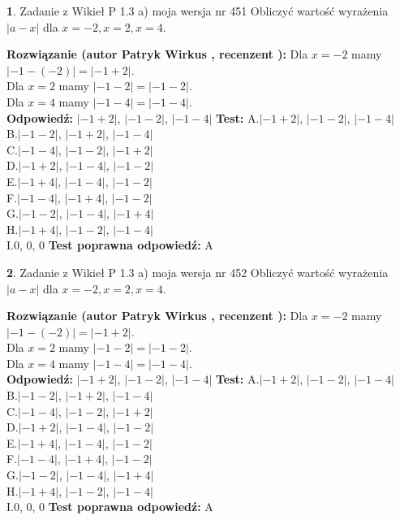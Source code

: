 \documentclass[12pt, a4paper]{article}
\theoremstyle{definition} %
\newtheorem{zad}{}
\newcommand{\zadStart}[1]{\begin{zad}#1\newline}
\newcommand{\zadStop}{\end{zad}}
\newcommand{\rozwStart}[2]{\noindent \textbf{Rozwiązanie (autor #1 , recenzent #2): }\newline}
\newcommand{\rozwStop}{\newline}
\newcommand{\odpStart}{\noindent \textbf{Odpowiedź:}\newline}
\newcommand{\odpStop}{\newline}
\newcommand{\testStart}{\noindent \textbf{Test:}\newline}
\newcommand{\testStop}{\newline}
\newcommand{\kluczStart}{\noindent \textbf{Test poprawna odpowiedź:}\newline}
\newcommand{\kluczStop}{\newline}
\begin{document}
\zadStart{Zadanie z Wikieł P 1.3 a) moja wersja nr 451}
Obliczyć wartość wyrażenia $|a - x|$ dla $x=-2,x=2,x=4$.
\zadStop
\rozwStart{Patryk Wirkus}{}
Dla $x = -2$ mamy $|-1 - (-2)| = |-1 + 2|$.\\
Dla $x = 2$ mamy $|-1 - 2| = |-1 - 2|$.\\
Dla $x = 4$ mamy $|-1 - 4| = |-1 - 4|$.\\
\rozwStop
\odpStart
$|-1 + 2|$, $|-1 - 2|$, $|-1 - 4|$
\odpStop
\testStart
A.$|-1 + 2|$, $|-1 - 2|$, $|-1 - 4|$\\
B.$|-1 - 2|$, $|-1 + 2|$, $|-1 - 4|$\\
C.$|-1 - 4|$, $|-1 - 2|$, $|-1 + 2|$\\
D.$|-1 + 2|$, $|-1 - 4|$, $|-1 - 2|$\\
E.$|-1 + 4|$, $|-1 - 4|$, $|-1 - 2|$\\
F.$|-1 - 4|$, $|-1 + 4|$, $|-1 - 2|$\\
G.$|-1 - 2|$, $|-1 - 4|$, $|-1 + 4|$\\
H.$|-1 + 4|$, $|-1 - 2|$, $|-1 - 4|$\\
I.$0$, $0$, $0$
\testStop
\kluczStart
A
\kluczStop



\zadStart{Zadanie z Wikieł P 1.3 a) moja wersja nr 452}
Obliczyć wartość wyrażenia $|a - x|$ dla $x=-2,x=2,x=4$.
\zadStop
\rozwStart{Patryk Wirkus}{}
Dla $x = -2$ mamy $|-1 - (-2)| = |-1 + 2|$.\\
Dla $x = 2$ mamy $|-1 - 2| = |-1 - 2|$.\\
Dla $x = 4$ mamy $|-1 - 4| = |-1 - 4|$.\\
\rozwStop
\odpStart
$|-1 + 2|$, $|-1 - 2|$, $|-1 - 4|$
\odpStop
\testStart
A.$|-1 + 2|$, $|-1 - 2|$, $|-1 - 4|$\\
B.$|-1 - 2|$, $|-1 + 2|$, $|-1 - 4|$\\
C.$|-1 - 4|$, $|-1 - 2|$, $|-1 + 2|$\\
D.$|-1 + 2|$, $|-1 - 4|$, $|-1 - 2|$\\
E.$|-1 + 4|$, $|-1 - 4|$, $|-1 - 2|$\\
F.$|-1 - 4|$, $|-1 + 4|$, $|-1 - 2|$\\
G.$|-1 - 2|$, $|-1 - 4|$, $|-1 + 4|$\\
H.$|-1 + 4|$, $|-1 - 2|$, $|-1 - 4|$\\
I.$0$, $0$, $0$
\testStop
\kluczStart
A
\kluczStop
\end{document}
